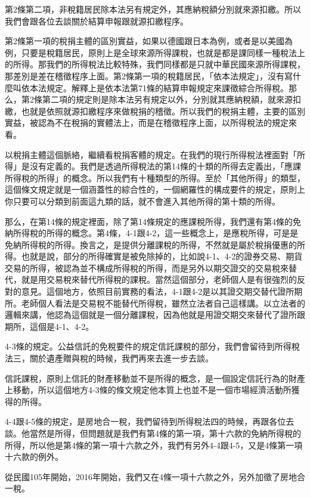 \documentclass[oneside,sub3section]{ctexbook}
\begin{document}
第2條第二項，非稅籍居民除本法另有規定外，其應納稅額分別就來源扣繳。所以我們會跟各位去談關於結算申報跟就源扣繳程序。

第2條第一項的稅捐主體的區別實益，如果以德國跟日本為例，或者是以美國為例，只要是稅籍居民，原則上是全球來源所得課稅，也就是都是課同樣一種稅法上的所得。那我們的所得稅法比較特殊，我們同樣都是只就中華民國來源所得課稅，那差別是差在稽徵程序上面。第2條第一項的稅籍居民，「依本法規定」，沒有寫什麼叫依本法規定。解釋上是依本法第71條的結算申報規定來課徵綜合所得稅。那么，第2條第二項的規定則是除本法另有規定以外，分別就其應納稅額，就來源扣繳，也就是依照就源扣繳程序來做稅捐的稽徵。所以我們的稅捐主體，主要的區別實益，被認為不在稅捐的實體法上，而是在稽徵程序上面，以所得稅法的規定來看。

以稅捐主體這個脈絡，繼續看稅捐客體的規定。在我們的現行所得稅法裡面對「所得」是沒有定義的。我們是透過所得稅法的第14條的十類的所得去定義出，「應課所得稅的所得」的概念。所以我們有十種類型的所得。至於「其他所得」的類型，這個條文規定就是一個涵蓋性的綜合性的，一個網羅性的構成要件的規定，原則上你只要可以分類到前面這九類的話，就不會進入其他所得的第十類的所得。

那么，在第14條的規定裡面，除了第14條規定的應課稅所得，我們還有第4條的免納所得稅的所得的概念。第4條，4-1跟4-2，這一些概念上，是應稅所得，可是是免納所得稅的所得。換言之，是提供分離課稅的所得，不然就是屬於稅捐優惠的所得。也就是說，部分的所得確實是被免除掉的，比如說4-1、4-2的證券交易、期貨交易的所得，被認為並不構成所得稅的所得，而是另外以期交證交的交易稅來替代，就是用交易稅來替代所得稅的課稅。當然這個部分，老師個人是有很強烈的反對的意見。這個地方，依照目前實務的看法，4-1跟4-2是以其證交期交替代證所期所。老師個人看法是交易稅不能替代所得稅，雖然立法者自己這樣講。以立法者的邏輯來講，他認為這個就是一個分離課稅，因為他就是用證交期交來替代了證所跟期所，這個是4-1、4-2。

4-3條的規定。公益信託的免稅要件的規定信託課稅的部分，我們會留待到所得稅法三，關於遺產贈與稅的時候，我們再來去進一步去談。

信託課稅，原則上信託的財產移動並不是所得的概念，是一個設定信託行為的財產上移動，所以這個地方4-3條的條文規定他本質上也並不是一個市場經濟活動所獲得的所得。

4-4跟4-5條的規定，是房地合一稅，我們留待到所得稅法四的時候，再跟各位去談。他當然是所得，但問題就是我們有第4條的第一項，第十六款的免納所得稅的所得，所以他是第4條的第一項十六款之外，我們有另外4-4跟4-5，又是4條第一項十六款的例外。

從民國105年開始，2016年開始，我們又在4條一項十六款之外，另外加徵了房地合一稅。
\end{document}
